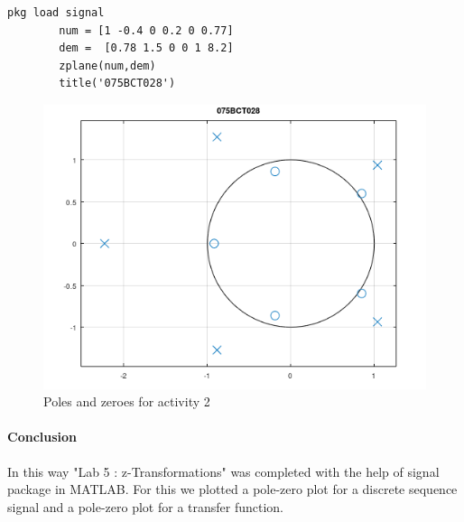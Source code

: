 \documentclass[12pt]{article}
\begin{document}
\begin{enumerate}
    \begin{Verbatim}[frame=single]
        pkg load signal
        num = [1 -0.4 0 0.2 0 0.77]
        dem =  [0.78 1.5 0 0 1 8.2]
        zplane(num,dem)
        title('075BCT028')
            \end{Verbatim}
            \begin{figure}[h!]
                \centering
                \includegraphics{labss/Lab5_2.PNG}
                \caption{Poles and zeroes for activity 2}
            \end{figure}
\end{enumerate}
\paragraph{Conclusion\\}
In this way "Lab 5 : z-Transformations" was completed with the help of signal package in MATLAB.
For this we plotted a pole-zero plot for a discrete sequence signal and a pole-zero plot for a transfer function.   
\end{document}
